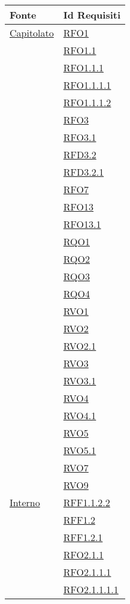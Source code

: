 \normalsize
\begin{longtable}{|>{\centering}m{5cm}|m{5cm}<{\centering}|}
\hline
\textbf{Fonte} & \textbf{Id Requisiti}\\
\hline
\endhead
\hyperlink{Capitolato}{Capitolato} & \hyperlink{RFO1}{RFO1}\\
& \hyperlink{RFO1.1}{RFO1.1}\\
& \hyperlink{RFO1.1.1}{RFO1.1.1}\\
& \hyperlink{RFO1.1.1.1}{RFO1.1.1.1}\\
& \hyperlink{RFO1.1.1.2}{RFO1.1.1.2}\\
& \hyperlink{RFO3}{RFO3}\\
& \hyperlink{RFO3.1}{RFO3.1}\\
& \hyperlink{RFD3.2}{RFD3.2}\\
& \hyperlink{RFD3.2.1}{RFD3.2.1}\\
& \hyperlink{RFO7}{RFO7}\\
& \hyperlink{RFO13}{RFO13}\\
& \hyperlink{RFO13.1}{RFO13.1}\\
& \hyperlink{RQO1}{RQO1}\\
& \hyperlink{RQO2}{RQO2}\\
& \hyperlink{RQO3}{RQO3}\\
& \hyperlink{RQO4}{RQO4}\\
& \hyperlink{RVO1}{RVO1}\\
& \hyperlink{RVO2}{RVO2}\\
& \hyperlink{RVO2.1}{RVO2.1}\\
& \hyperlink{RVO3}{RVO3}\\
& \hyperlink{RVO3.1}{RVO3.1}\\
& \hyperlink{RVO4}{RVO4}\\
& \hyperlink{RVO4.1}{RVO4.1}\\
& \hyperlink{RVO5}{RVO5}\\
& \hyperlink{RVO5.1}{RVO5.1}\\
& \hyperlink{RVO7}{RVO7}\\
& \hyperlink{RVO9}{RVO9}\\ \hline
\hyperlink{Interno}{Interno} & \hyperlink{RFF1.1.2.2}{RFF1.1.2.2}\\
& \hyperlink{RFF1.2}{RFF1.2}\\
& \hyperlink{RFF1.2.1}{RFF1.2.1}\\
& \hyperlink{RFO2.1.1}{RFO2.1.1}\\
& \hyperlink{RFO2.1.1.1}{RFO2.1.1.1}\\
& \hyperlink{RFO2.1.1.1.1}{RFO2.1.1.1.1}\\

\end{longtable}
